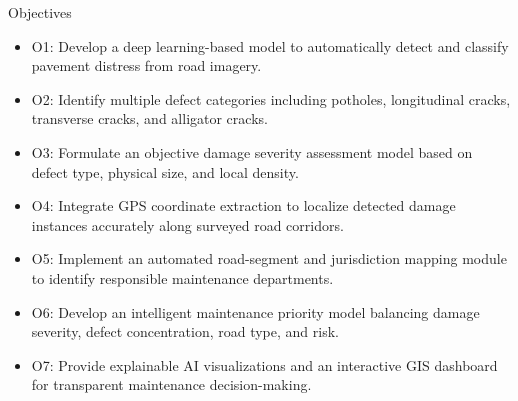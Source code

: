 \documentclass[10pt]{beamer}
\def\textbf#1{#1}%
\def\begin#1{}%
\def\end#1{}%
\begin{document}
\begin{frame}{Objectives}
    \begin{itemize}
        \setlength{\itemsep}{0.65em}
        \item \textbf{O1:} Develop a deep learning-based model to automatically detect and classify pavement distress from road imagery.
        \item \textbf{O2:} Identify multiple defect categories including potholes, longitudinal cracks, transverse cracks, and alligator cracks.
        \item \textbf{O3:} Formulate an objective damage severity assessment model based on defect type, physical size, and local density.
        \item \textbf{O4:} Integrate GPS coordinate extraction to localize detected damage instances accurately along surveyed road corridors.
        \item \textbf{O5:} Implement an automated road-segment and jurisdiction mapping module to identify responsible maintenance departments.
        \item \textbf{O6:} Develop an intelligent maintenance priority model balancing damage severity, defect concentration, road type, and risk.
        \item \textbf{O7:} Provide explainable AI visualizations and an interactive GIS dashboard for transparent maintenance decision-making.
    \end{itemize}
\end{frame}
\end{document}
